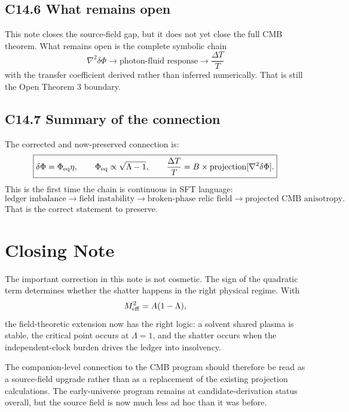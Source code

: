 \documentclass[11pt]{article}
\begin{document}
\subsection*{C14.6 What remains open}
This note closes the source-field gap, but it does not yet close the full CMB theorem. What remains open is the complete symbolic chain
\begin{equation}
\nabla^2\delta\Phi \longrightarrow \text{photon-fluid response} \longrightarrow \frac{\Delta T}{T}
\end{equation}
with the transfer coefficient derived rather than inferred numerically. That is still the Open Theorem 3 boundary.

\subsection*{C14.7 Summary of the connection}
The corrected and now-preserved connection is:
\begin{equation}
\boxed{\delta\Phi=\Phi_{\rm eq}\eta,\qquad \Phi_{\rm eq}\propto\sqrt{\Lambda-1},\qquad \frac{\Delta T}{T}=B\times \mathrm{projection}[\nabla^2\delta\Phi].}
\end{equation}
This is the first time the chain is continuous in SFT language:
\begin{equation}
\text{ledger imbalance} \longrightarrow \text{field instability} \longrightarrow \text{broken-phase relic field} \longrightarrow \text{projected CMB anisotropy}.
\end{equation}
That is the correct statement to preserve.

\section*{Closing Note}
The important correction in this note is not cosmetic. The sign of the quadratic term determines whether the shatter happens in the right physical regime. With
\begin{equation}
M_{\rm eff}^2=A(1-\Lambda),
\end{equation}
the field-theoretic extension now has the right logic: a solvent shared plasma is stable, the critical point occurs at $\Lambda=1$, and the shatter occurs when the independent-clock burden drives the ledger into insolvency.

The companion-level connection to the CMB program should therefore be read as a source-field upgrade rather than as a replacement of the existing projection calculations. The early-universe program remains at candidate-derivation status overall, but the source field is now much less ad hoc than it was before.
\end{document}
